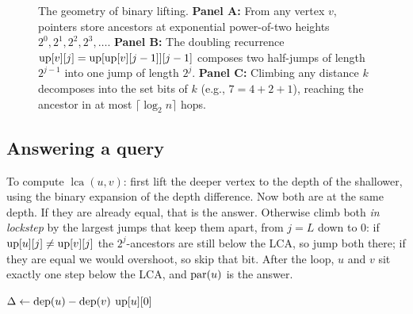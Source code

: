 \begin{figure}[H]
\caption{The geometry of binary lifting. \textbf{Panel A:} From any vertex $v$, pointers store ancestors at exponential power-of-two heights $2^0, 2^1, 2^2, 2^3, \dots$. \textbf{Panel B:} The doubling recurrence $\mathrm{up}[v][j]=\mathrm{up}[\mathrm{up}[v][j-1]][j-1]$ composes two half-jumps of length $2^{j-1}$ into one jump of length $2^j$. \textbf{Panel C:} Climbing any distance $k$ decomposes into the set bits of $k$ (e.g., $7 = 4 + 2 + 1$), reaching the ancestor in at most $\lceil \log_2 n \rceil$ hops.}
\label{ch23:fig-lifting-jumps}
\end{figure}

\subsection{Answering a query}

To compute $\operatorname{lca}(u,v)$: first lift the deeper vertex to the depth of the
shallower, using the binary expansion of the depth difference. Now both are at the same
depth. If they are already equal, that is the answer. Otherwise climb both \emph{in
lockstep} by the largest jumps that keep them apart, from $j=L$ down to $0$: if
$\mathrm{up}[u][j]\neq\mathrm{up}[v][j]$ the $2^j$-ancestors are still below the LCA, so jump both there;
if they are equal we would overshoot, so skip that bit. After the loop, $u$ and $v$ sit
exactly one step below the LCA, and $\operatorname{par}(u)$ is the answer.

\begin{algorithm}[H]
\DontPrintSemicolon
\caption{\textsc{LiftLCA}$(u,v)$}
$\Delta \gets \operatorname{dep}(u)-\operatorname{dep}(v)$\;
\Return $\mathrm{up}[u][0]$\;
\end{algorithm}

